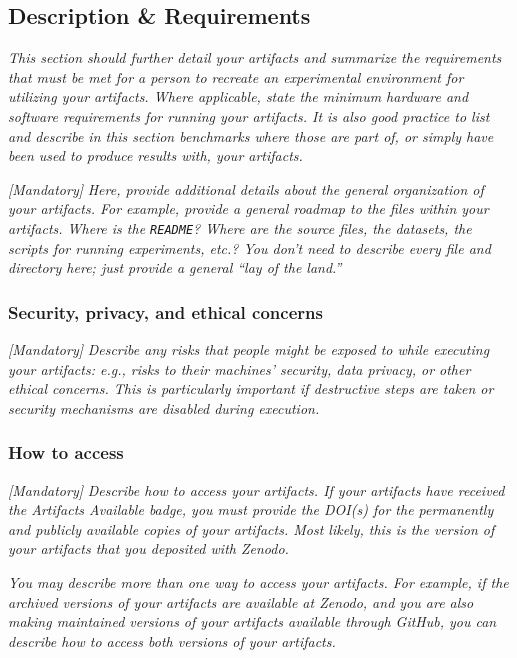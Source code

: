 
\subsection{Description \& Requirements}

\emph{This section should further detail your artifacts and summarize
the requirements that must be met for a person to recreate an
experimental environment for utilizing your artifacts.  Where
applicable, state the minimum hardware and software requirements for
running your artifacts.  It is also good practice to list and describe
in this section benchmarks where those are part of, or simply have
been used to produce results with, your artifacts.}

\emph{[Mandatory]}
%
\emph{Here, provide additional details about the general organization
of your artifacts.  For example, provide a general roadmap to the
files within your artifacts.  Where is the \texttt{README}?  Where are
the source files, the datasets, the scripts for running experiments,
etc.?  You don't need to describe every file and directory here; just
provide a general ``lay of the land.''}


\subsubsection{Security, privacy, and ethical concerns}

\emph{[Mandatory]}
%
\emph{Describe any risks that people might be exposed to while
executing your artifacts: e.g., risks to their machines' security,
data privacy, or other ethical concerns.  This is particularly
important if destructive steps are taken or security mechanisms are
disabled during execution.}


\subsubsection{How to access}

\emph{[Mandatory]}
%
\emph{Describe how to access your artifacts.  If your artifacts have
received the \emph{Artifacts Available} badge, you must provide the
DOI(s) for the permanently and publicly available copies of your
artifacts.  Most likely, this is the version of your artifacts that
you deposited with Zenodo.}

\emph{You may describe more than one way to access your artifacts.
For example, if the archived versions of your artifacts are available
at Zenodo, and you are also making maintained versions of your
artifacts available through GitHub, you can describe how to access
both versions of your artifacts.}

